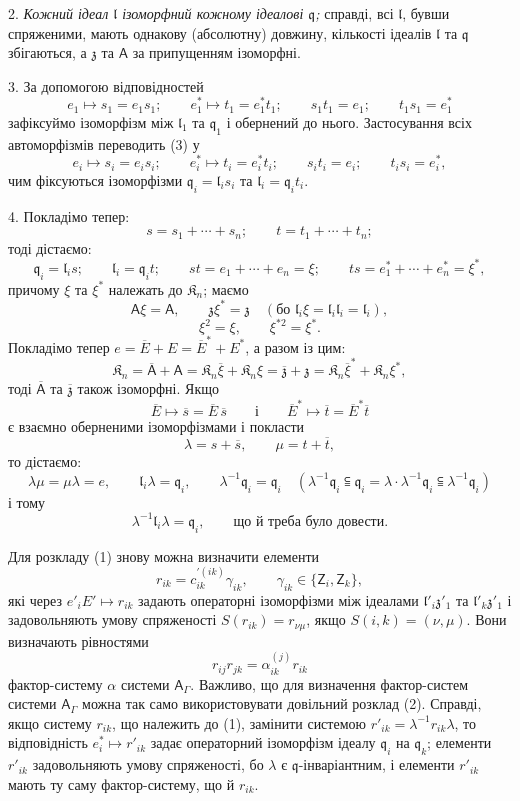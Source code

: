 \documentclass[11pt]{article}
\begin{document}
2. \emph{Кожний ідеал \(\mathfrak l\) ізоморфний кожному ідеалові \(\mathfrak q\);} справді, всі \(\mathfrak l\), бувши спряженими, мають однакову (абсолютну) довжину, кількості ідеалів \(\mathfrak l\) та \(\mathfrak q\) збігаються, а \(\mathfrak z\) та \(\mathsf{A}\) за припущенням ізоморфні.

3. За допомогою відповідностей
\[
\tag{3}
e_1\mapsto s_1=e_1s_1;\qquad
e_1^*\mapsto t_1=e_1^*t_1;\qquad
s_1t_1=e_1;\qquad
t_1s_1=e_1^*
\]
зафіксуймо ізоморфізм між \(\mathfrak l_1\) та \(\mathfrak q_1\) і обернений до нього. Застосування всіх автоморфізмів переводить (3) у
\[
e_i\mapsto s_i=e_is_i;\qquad
e_i^*\mapsto t_i=e_i^*t_i;\qquad
s_it_i=e_i;\qquad
t_is_i=e_i^*,
\]
чим фіксуються ізоморфізми \(\mathfrak q_i=\mathfrak l_is_i\) та \(\mathfrak l_i=\mathfrak q_it_i\).

4. Покладімо тепер:
\[
s=s_1+\cdots+s_n;\qquad t=t_1+\cdots+t_n;
\]
тоді дістаємо:
\[
\mathfrak q_i=\mathfrak l_is;\qquad
\mathfrak l_i=\mathfrak q_it;\qquad
st=e_1+\cdots+e_n=\xi;\qquad
ts=e_1^*+\cdots+e_n^*=\xi^*,
\]
причому \(\xi\) та \(\xi^*\) належать до \(\mathfrak K_n\); маємо
\[
\mathsf{A}\xi=\mathsf{A},\qquad \mathfrak z\xi^*=\mathfrak z\quad
(\text{бо }\mathfrak l_i\xi=\mathfrak l_i\mathfrak l_i=\mathfrak l_i),
\]
\[
\xi^2=\xi,\qquad \xi^{*2}=\xi^*.
\]
Покладімо тепер \(e=\overline E+E=\overline E^*+E^*\), а разом із цим:
\[
\mathfrak K_n=\overline{\mathsf A}+\mathsf{A}
=\mathfrak K_n\overline\xi+\mathfrak K_n\xi
=\overline{\mathfrak z}+\mathfrak z
=\mathfrak K_n\overline\xi^*+\mathfrak K_n\xi^*,
\]
тоді \(\overline{\mathsf A}\) та \(\overline{\mathfrak z}\) також ізоморфні. Якщо
\[
\overline E\mapsto\overline s=\overline E\,\overline s
\qquad\text{і}\qquad
\overline E^*\mapsto\overline t=\overline E^*\overline t
\]
є взаємно оберненими ізоморфізмами і покласти
\[
\lambda=s+\overline s,\qquad \mu=t+\overline t,
\]
то дістаємо:
\[
\lambda\mu=\mu\lambda=e,\qquad
\mathfrak l_i\lambda=\mathfrak q_i,\qquad
\lambda^{-1}\mathfrak q_i=\mathfrak q_i
\quad
(\lambda^{-1}\mathfrak q_i\subseteqq\mathfrak q_i
=\lambda\cdot\lambda^{-1}\mathfrak q_i\subseteqq\lambda^{-1}\mathfrak q_i)
\]
і тому
\[
\lambda^{-1}\mathfrak l_i\lambda=\mathfrak q_i,\qquad \text{що й треба було довести.}
\]

Для розкладу (1) знову можна визначити елементи
\[
r_{ik}=c_{ik}^{\prime(ik)}\gamma_{ik},\qquad \gamma_{ik}\in\{\mathsf{Z}_i,\mathsf{Z}_k\},
\]
які через \(e'_iE'\mapsto r_{ik}\) задають операторні ізоморфізми між ідеалами \(\mathfrak l'_i\mathfrak z'_1\) та \(\mathfrak l'_k\mathfrak z'_1\) і задовольняють умову спряженості \(S(r_{ik})=r_{\nu\mu}\), якщо \(S(i,k)=(\nu,\mu)\). Вони визначають рівностями
\[
r_{ij}r_{jk}=\alpha_{ik}^{(j)}r_{ik}
\]
фактор-систему \(\alpha\) системи \(\mathsf{A}_\Gamma\). Важливо, що для визначення фактор-систем системи \(\mathsf{A}_\Gamma\) можна так само використовувати довільний розклад (2). Справді, якщо систему \(r_{ik}\), що належить до (1), замінити системою \(r'_{ik}=\lambda^{-1}r_{ik}\lambda\), то відповідність \(e_i^*\mapsto r'_{ik}\) задає операторний ізоморфізм ідеалу \(\mathfrak q_i\) на \(\mathfrak q_k\); елементи \(r'_{ik}\) задовольняють умову спряженості, бо \(\lambda\) є \(\mathfrak q\)-інваріантним, і елементи \(r'_{ik}\) мають ту саму фактор-систему, що й \(r_{ik}\).
\end{document}
